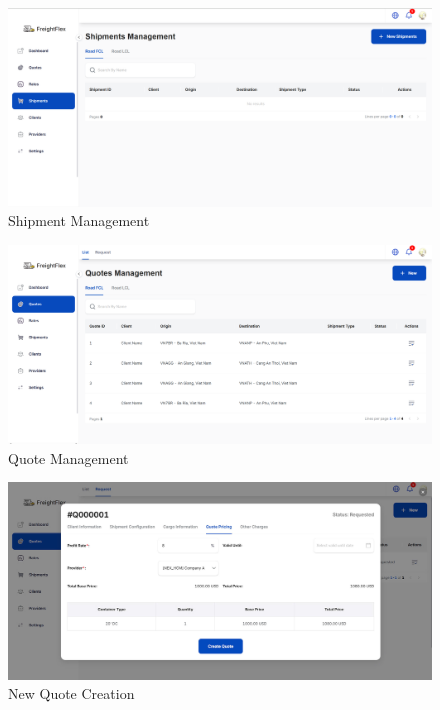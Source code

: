 \begin{figure}[H]
    \centering
    \includegraphics[width=15cm]{graphics/UI/shipment-management.png}
    \caption{Shipment Management}
    \label{fig:shipment-management}
\end{figure}

\begin{figure}[H]
    \centering
    \includegraphics[width=15cm]{graphics/UI/quote-managemet.png}
    \caption{Quote Management}
    \label{fig:quote-management}
\end{figure}

\begin{figure}[H]
    \centering
    \includegraphics[width=15cm]{graphics/UI/quote-pricing.png}
    \caption{New Quote Creation}
    \label{fig:new-quotes}
\end{figure}

